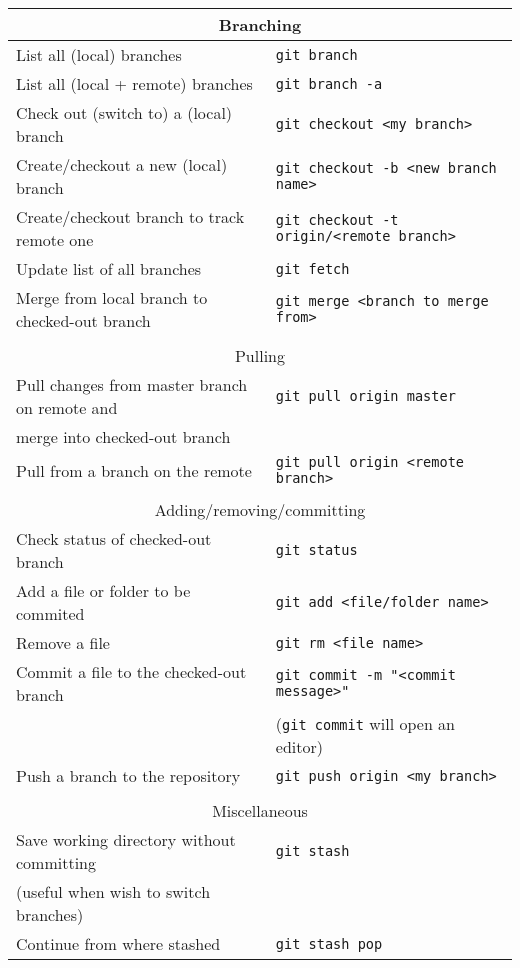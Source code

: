 \documentclass[11pt]{article}
\begin{document}
\begin{center}
  \begin{tabular}{ll} \toprule
    \multicolumn{2}{c}{Branching} \\ \midrule
    List all (local) branches & \texttt{git branch} \\
    List all (local + remote) branches & \texttt{git branch -a} \\
    Check out (switch to) a (local) branch & \texttt{git checkout <my branch>} \\
    Create/checkout a new (local) branch & \texttt{git checkout -b <new branch name>} \\
    Create/checkout branch to track remote one & \texttt{git checkout -t origin/<remote branch>} \\
    Update list of all branches & \texttt{git fetch} \\
    Merge from local branch to checked-out branch & \texttt{git merge <branch to merge from>} \\
    \\
    \toprule
    \multicolumn{2}{c}{Pulling} \\ \midrule
    Pull changes from master branch on remote and & \texttt{git pull origin master} \\
    merge into checked-out branch \\
    Pull from a branch on the remote & \texttt{git pull origin <remote branch>} \\
    \\
    \toprule
    \multicolumn{2}{c}{Adding/removing/committing} \\ \midrule
    Check status of checked-out branch & \texttt{git status} \\
    Add a file or folder to be commited & \texttt{git add <file/folder name>} \\
    Remove a file & \texttt{git rm <file name>} \\
    Commit a file to the checked-out branch & \texttt{git commit -m "<commit
      message>"} \\
    & (\texttt{git commit} will open an editor) \\
    Push a branch to the repository & \texttt{git push origin <my branch>} \\
    \\
    \toprule
    \multicolumn{2}{c}{Miscellaneous} \\ \midrule
    Save working directory without committing & \texttt{git stash} \\
    (useful when wish to switch branches) \\
    Continue from where stashed & \texttt{git stash pop} \\
    \bottomrule
  \end{tabular}
\end{center}
\end{document}
